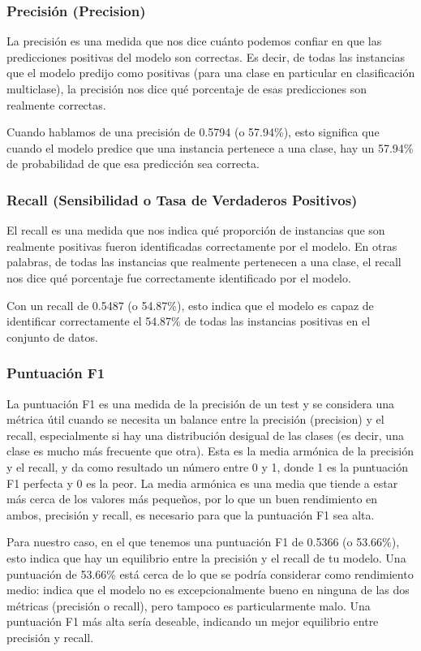 \subsubsection{Precisión (Precision)}
La precisión es una medida que nos dice cuánto podemos confiar en que las predicciones positivas del modelo son correctas. Es decir, de todas las instancias que el modelo predijo como positivas (para una clase en particular en clasificación multiclase), la precisión nos dice qué porcentaje de esas predicciones son realmente correctas.

Cuando hablamos de una precisión de 0.5794 (o 57.94\%), esto significa que cuando el modelo predice que una instancia pertenece a una clase, hay un 57.94\% de probabilidad de que esa predicción sea correcta.


\subsubsection{Recall (Sensibilidad o Tasa de Verdaderos Positivos)}
El recall es una medida que nos indica qué proporción de instancias que son realmente positivas fueron identificadas correctamente por el modelo. En otras palabras, de todas las instancias que realmente pertenecen a una clase, el recall nos dice qué porcentaje fue correctamente identificado por el modelo.

Con un recall de 0.5487 (o 54.87\%), esto indica que el modelo es capaz de identificar correctamente el 54.87\% de todas las instancias positivas en el conjunto de datos.

\subsubsection{Puntuación F1}

La puntuación F1 es una medida de la precisión de un test y se considera una métrica útil cuando se necesita un balance entre la precisión (precision) y el recall, especialmente si hay una distribución desigual de las clases (es decir, una clase es mucho más frecuente que otra).
Esta es la media armónica de la precisión y el recall, y da como resultado un número entre 0 y 1, donde 1 es la puntuación F1 perfecta y 0 es la peor. La media armónica es una media que tiende a estar más cerca de los valores más pequeños, por lo que un buen rendimiento en ambos, precisión y recall, es necesario para que la puntuación F1 sea alta.

Para nuestro caso, en el que tenemos una puntuación F1 de 0.5366 (o 53.66\%), esto indica que hay un equilibrio entre la precisión y el recall de tu modelo. Una puntuación de 53.66\% está cerca de lo que se podría considerar como rendimiento medio: indica que el modelo no es excepcionalmente bueno en ninguna de las dos métricas (precisión o recall), pero tampoco es particularmente malo. Una puntuación F1 más alta sería deseable, indicando un mejor equilibrio entre precisión y recall.

